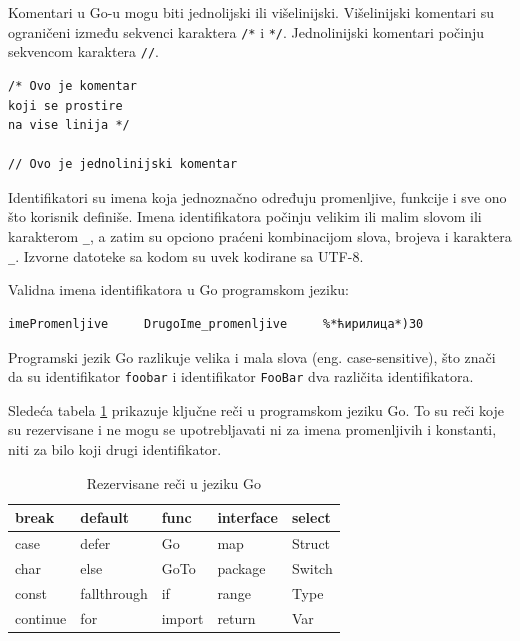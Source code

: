 \documentclass[a4paper]{article}
\begin{document}
Komentari u Go-u  mogu biti jednolijski ili višelinijski. Višelinijski komentari su ograničeni između sekvenci karaktera \texttt{/*} i \texttt{*/}. Jednolinijski komentari počinju sekvencom karaktera \texttt{//}.

\begin{lstlisting}[caption={Komentari},frame=single, label=komentari]
/* Ovo je komentar
koji se prostire
na vise linija */

// Ovo je jednolinijski komentar
\end{lstlisting}

Identifikatori su imena koja jednoznačno određuju promenljive, funkcije i sve ono što korisnik definiše. Imena identifikatora počinju velikim ili malim slovom ili karakterom \texttt{\_}, a zatim su opciono praćeni kombinacijom slova, brojeva i karaktera \texttt{\_}. Izvorne datoteke sa kodom su uvek kodirane sa UTF-8.

Validna imena identifikatora u Go programskom jeziku: 

\begin{lstlisting}[caption={Imenovanje identifikatora},frame=single, label=identifikatori]
imePromenljive     DrugoIme_promenljive     %*ћирилица*)30
\end{lstlisting}

Programski jezik Go razlikuje velika i mala slova (eng.  case-sensitive), što znači da su identifikator \texttt{foobar} i identifikator \texttt{FooBar} dva različita identifikatora.

Sledeća tabela \ref{tab:tabela1} prikazuje ključne reči u programskom jeziku Go. To su reči koje su rezervisane i ne mogu se upotrebljavati ni za imena promenljivih i konstanti, niti za bilo koji drugi identifikator.

\begin{table}[h!]
\begin{center}
\caption{Rezervisane reči u jeziku Go}
\begin{tabular}{|l|l|l|l|l|}
\hline
break    & default     & func   & interface & select \\ \hline
case     & defer       & Go     & map       & Struct \\ \hline
char     & else        & GoTo   & package   & Switch \\ \hline
const    & fallthrough & if     & range     & Type   \\ \hline
continue & for         & import & return    & Var   \\ \hline
\end{tabular}
\label{tab:tabela1}

\end{center}
\end{table}
\end{document}
